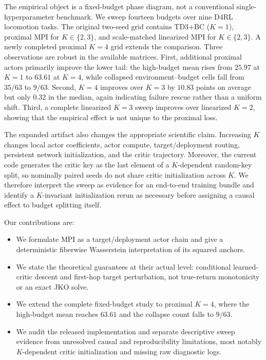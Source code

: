 The empirical object is a fixed-budget phase diagram, not a conventional single-hyperparameter benchmark. We sweep fourteen budgets over nine D4RL locomotion tasks. The original two-seed grid contains TD3+BC ($K=1$), proximal MPI for $K\in\{2,3\}$, and scale-matched linearized MPI for $K\in\{2,3\}$. A newly completed proximal $K=4$ grid extends the comparison. Three observations are robust in the available matrices. First, additional proximal actors primarily improve the lower tail: the high-budget mean rises from $25.97$ at $K=1$ to $63.61$ at $K=4$, while collapsed environment--budget cells fall from $35/63$ to $9/63$. Second, $K=4$ improves over $K=3$ by $10.83$ points on average but only $0.32$ in the median, again indicating failure rescue rather than a uniform shift. Third, a complete linearized $K=3$ sweep improves over linearized $K=2$, showing that the empirical effect is not unique to the proximal loss.

The expanded artifact also changes the appropriate scientific claim. Increasing $K$ changes local actor coefficients, actor compute, target/deployment routing, persistent network initialization, and the critic trajectory. Moreover, the current code generates the critic key as the last element of a $K$-dependent random-key split, so nominally paired seeds do not share critic initialization across $K$. We therefore interpret the sweep as evidence for an end-to-end training bundle and identify a $K$-invariant initialization rerun as necessary before assigning a causal effect to budget splitting itself.

Our contributions are:
\begin{itemize}
    \item We formulate MPI as a target/deployment actor chain and give a deterministic fiberwise Wasserstein interpretation of its squared anchors.
    \item We state the theoretical guarantees at their actual level: conditional learned-critic descent and first-hop target perturbation, not true-return monotonicity or an exact JKO solve.
    \item We extend the complete fixed-budget study to proximal $K=4$, where the high-budget mean reaches $63.61$ and the collapse count falls to $9/63$.
    \item We audit the released implementation and separate descriptive sweep evidence from unresolved causal and reproducibility limitations, most notably $K$-dependent critic initialization and missing raw diagnostic logs.
\end{itemize}
